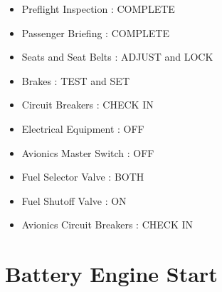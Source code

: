 \begin{itemize}
\item{} Preflight Inspection : COMPLETE

\item{} Passenger Briefing : COMPLETE

\item{} Seats and Seat Belts : ADJUST and LOCK

\item{} Brakes : TEST and SET

\item{} Circuit Breakers : CHECK IN

\item{} Electrical Equipment : OFF

\item{} Avionics Master Switch : OFF

\item{} Fuel Selector Valve : BOTH

\item{} Fuel Shutoff Valve : ON

\item{} Avionics Circuit Breakers : CHECK IN

\end{itemize}

\chapter{Battery Engine Start}
\label{batteryenginestart}

